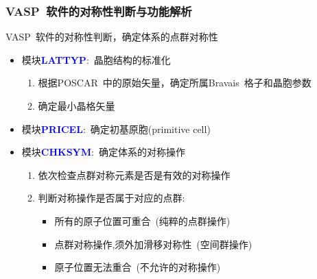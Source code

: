 \documentclass[cjk,slidestop,handout,compress,mathserif,blue]{beamer}	%
\begin{document}
\frame
{
	\frametitle{\textrm{VASP~}软件的对称性判断与功能解析}
	\textrm{VASP~}软件的对称性判断，确定体系的点群对称性
	\begin{itemize}
		\item 模块\textcolor{blue}{\textbf{LATTYP}}:~晶胞结构的标准化
			\begin{enumerate}
				\item 根据\textrm{POSCAR~}中的原始矢量，确定所属\textrm{Bravais~}格子和晶胞参数
				\item 确定最小晶格矢量
			\end{enumerate}
		\item 模块\textcolor{blue}{\textbf{PRICEL}}:~确定初基原胞(\textrm{primitive cell})
		\item 模块\textcolor{blue}{\textbf{CHKSYM}}:~确定体系的对称操作
			\begin{enumerate}
				\item 依次检查点群对称元素是否是有效的对称操作
				\item 判断对称操作是否属于对应的点群:
					\begin{itemize}
						\item 所有的原子位置可重合~(纯粹的点群操作)
						\item 点群对称操作,须外加滑移对称性~(空间群操作)
						\item 原子位置无法重合~(不允许的对称操作)
					\end{itemize}
			\end{enumerate}
	\end{itemize}
}
\end{document}

